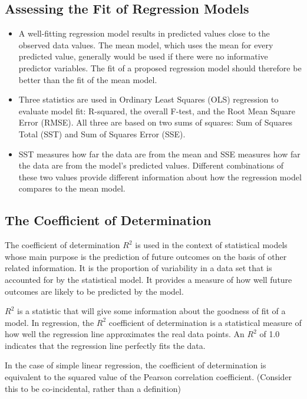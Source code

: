 \documentclass[]{report}
\begin{document}
\subsection*{Assessing the Fit of Regression Models}
\begin{itemize}
\item 
A well-fitting regression model results in predicted values close to the observed data values. The mean model, which uses the mean for every predicted value, generally would be used if there were no informative predictor variables. The fit of a proposed regression model should therefore be better than the fit of the mean model.
\item 
Three statistics are used in Ordinary Least Squares (OLS) regression to evaluate model fit: R-squared, the overall F-test, and the Root Mean Square Error (RMSE). All three are based on two sums of squares: Sum of Squares Total (SST) and Sum of Squares Error (SSE).
\item SST measures how far the data are from the mean and SSE measures how far the data are from the model’s predicted values. Different combinations of these two values provide different information about how the regression model compares to the mean model.
\end{itemize}



\subsection{The Coefficient of Determination}

The coefficient of determination $R^2$ is used in the context of statistical models whose main purpose is the prediction of future outcomes on the basis of other related information. It is the proportion of variability in a data set that is accounted for by the statistical model. It provides a measure of how well future outcomes are likely to be predicted by the model.

$R^2$ is a statistic that will give some information about the goodness of fit of a model. In regression, the $R^2$ coefficient of determination is a statistical measure of how well the regression line approximates the real data points. An $R^2$ of 1.0 indicates that the regression line perfectly fits the data.

In the case of simple linear regression, the coefficient of determination is equivalent to the squared value of the Pearson correlation coefficient. (Consider this to be co-incidental, rather than a definition)
\end{document}
